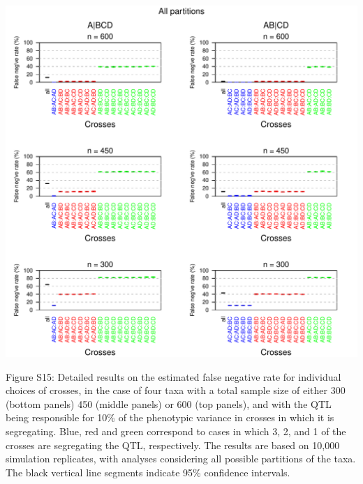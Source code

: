 \documentclass[letterpaper,twoside]{article}
\begin{document}
{\centering
\includegraphics{SuppFigs/detailedns_allpart.pdf}}

\bigskip \noindent
Figure S15: Detailed results on the estimated false negative rate
  for individual choices of crosses, in the case of four taxa
  with a total sample size of either 300 (bottom panels)
  450 (middle panels) or 600 (top panels),
  and with the QTL being responsible
  for 10\% of the phenotypic variance in crosses in which it is
  segregating. Blue, red and green correspond to cases in which 3, 2,
  and 1 of the crosses are segregating the QTL, respectively.  The
  results are based on 10,000 simulation replicates, with analyses
  considering all possible partitions of the taxa.  The black vertical
  line segments indicate 95\% confidence
  intervals.

\newpage
\end{document}
